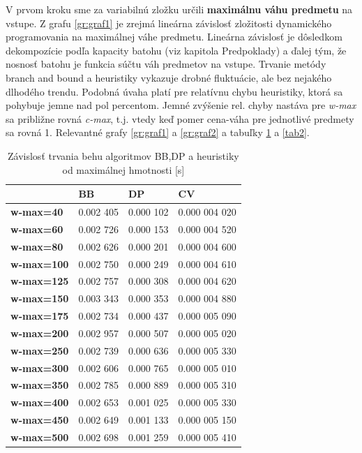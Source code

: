 \documentclass[slovak]{article}
\begin{document}
V prvom kroku sme za variabilnú zložku určili \textbf{maximálnu váhu predmetu} na vstupe. Z grafu \ref{gr:graf1} je zrejmá lineárna závislosť zložitosti dynamického programovania na maximálnej váhe predmetu. Lineárna závislosť je dôsledkom dekompozície podľa kapacity batohu (viz kapitola Predpoklady) a ďalej tým, že nosnosť batohu je funkcia súčtu váh predmetov na vstupe. Trvanie metódy branch and bound a heuristiky vykazuje drobné fluktuácie, ale bez nejakého dlhodého trendu. Podobná úvaha platí pre relatívnu chybu heuristiky, ktorá sa pohybuje jemne nad pol percentom. Jemné zvýšenie rel. chyby nastáva pre \emph{w-max} sa približne rovná \emph{c-max}, t.j. vtedy keď pomer cena-váha pre jednotlivé predmety sa rovná 1. Relevantné grafy \ref{gr:graf1} a \ref{gr:graf2} a tabuľky \ref{tab1} a \ref{tab2}.

\begin{table}[htb!]\centering
	\begin{tabularx}{\textwidth}{ | X | X | X | X |}
	  \hline                       
							& \textbf{BB} 	& \textbf{DP} 	& \textbf{CV} 	\\ \hline
		\textbf{w-max=40}	&	0.002 405	&	0.000 102	&	0.000 004 020	\\ \hline
		\textbf{w-max=60}	&	0.002 726	&	0.000 153	&	0.000 004 520	\\ \hline
		\textbf{w-max=80}	&	0.002 626	&	0.000 201	&	0.000 004 600	\\ \hline
		\textbf{w-max=100}	&	0.002 750	&	0.000 249	&	0.000 004 610	\\ \hline
		\textbf{w-max=125}	&	0.002 757	&	0.000 308	&	0.000 004 620	\\ \hline
		\textbf{w-max=150}	&	0.003 343	&	0.000 353	&	0.000 004 880	\\ \hline
		\textbf{w-max=175}	&	0.002 734	&	0.000 437	&	0.000 005 090	\\ \hline
		\textbf{w-max=200}	&	0.002 957	&	0.000 507	&	0.000 005 020	\\ \hline
		\textbf{w-max=250}	&	0.002 739	&	0.000 636	&	0.000 005 330	\\ \hline
		\textbf{w-max=300}	&	0.002 606	&	0.000 765	&	0.000 005 010	\\ \hline
		\textbf{w-max=350}	&	0.002 785	&	0.000 889	&	0.000 005 310	\\ \hline
		\textbf{w-max=400}	&	0.002 653	&	0.001 025	&	0.000 005 330	\\ \hline
		\textbf{w-max=450}	&	0.002 649	&	0.001 133	&	0.000 005 150	\\ \hline								
		\textbf{w-max=500}	&	0.002 698	&	0.001 259	&	0.000 005 410	\\ \hline								
	\end{tabularx}
\caption{Závislosť trvania behu algoritmov BB,DP a heuristiky od maximálnej hmotnosti [s]}
\label{tab1}
\end{table}
\end{document}

